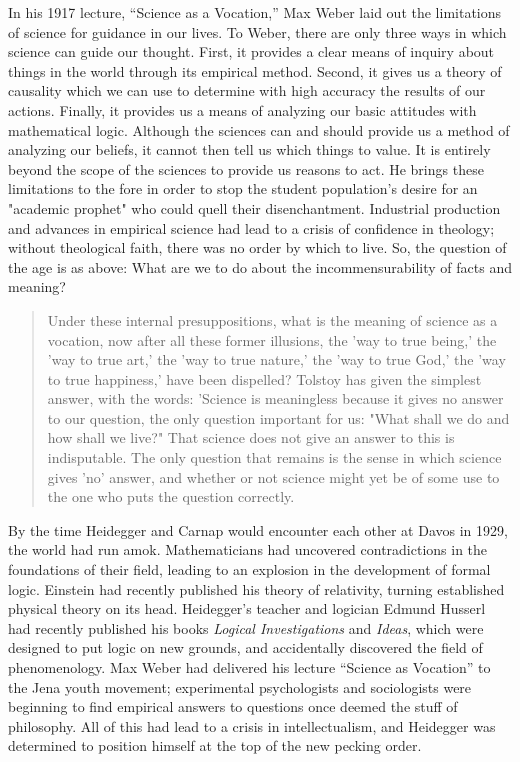 \documentclass[leqno, 12pt]{turabian-researchpaper}
\begin{document}
	In his 1917 lecture, \enquote{Science as a Vocation,} Max Weber laid out the
	limitations of science for guidance in our lives. To Weber, there are only
	three ways in which science can guide our thought. First, it provides a clear
	means of inquiry about things in the world through its empirical method. Second,
	it gives us a theory of causality which we can use to determine with high
	accuracy the results of our actions. Finally, it provides us a means of
	analyzing our basic attitudes with mathematical logic. Although the sciences can
	and should provide us a method of analyzing our beliefs, it cannot then tell
	us which things to value. It is entirely beyond the scope of the sciences to provide
	us reasons to act. He brings these limitations to the fore in order to stop
	the student population's desire for an "academic prophet" who could quell
	their disenchantment. Industrial production and advances in empirical science had
	lead to a crisis of confidence in theology; without theological faith, there was
	no order by which to live. So, the question of the age is as above: What are
	we to do about the incommensurability of facts and meaning?

	\blockquote[{\cite[139]{weber2014}}]{Under these internal presuppositions, what is the meaning of science as a vocation, now after all these former illusions, the 'way to true being,' the 'way to true art,' the 'way to true nature,' the 'way to true God,' the 'way to true happiness,' have been dispelled? Tolstoy has given the simplest answer, with the words: 'Science is meaningless because it gives no answer to our question, the only question important for us: "What shall we do and how shall we live?" That science does not give an answer to this is indisputable. The only question that remains is the sense in which science gives 'no' answer, and whether or not science might yet be of some use to the one who puts the question correctly.}

	\iffalse
	By the time Heidegger and Carnap would encounter each other at Davos in 1929,
	the world had run amok. Mathematicians had uncovered contradictions in the foundations
	of their field, leading to an explosion in the development of formal logic. Einstein
	had recently published his theory of relativity, turning established physical
	theory on its head. Heidegger's teacher and logician Edmund Husserl had recently
	published his books \textit{Logical Investigations} \nocite{husserl2005} and \textit{Ideas},
	which were designed to put logic on new grounds, and accidentally discovered
	the field of phenomenology. Max Weber had delivered his lecture \enquote{Science as Vocation}
	to the Jena youth movement; experimental psychologists and sociologists were beginning
	to find empirical answers to questions once deemed the stuff of philosophy.
	All of this had lead to a crisis in intellectualism, and Heidegger was determined
	to position himself at the top of the new pecking order.
\end{document}
